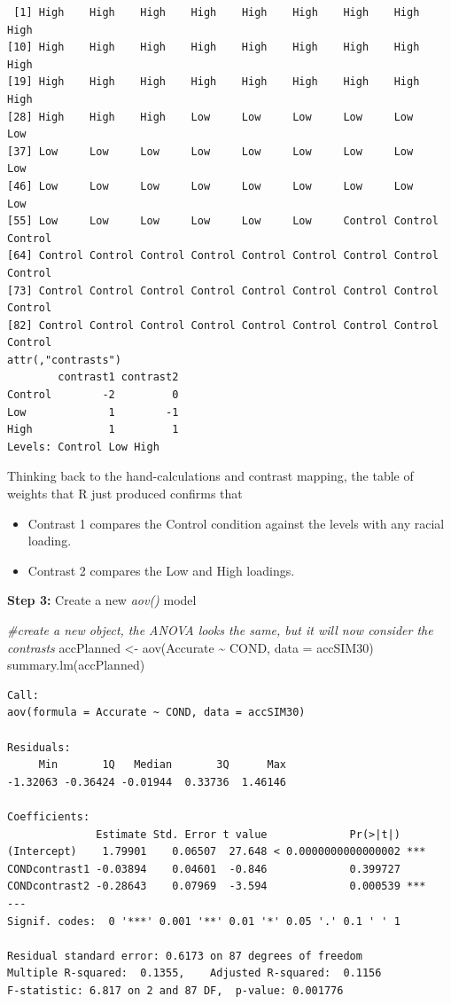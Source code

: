 \documentclass[
  english,
]{book}
\newenvironment{Shaded}{\begin{snugshade}}{\end{snugshade}}
\newcommand{\AttributeTok}[1]{\textcolor[rgb]{0.77,0.63,0.00}{#1}}
\newcommand{\CommentTok}[1]{\textcolor[rgb]{0.56,0.35,0.01}{\textit{#1}}}
\newcommand{\FunctionTok}[1]{\textcolor[rgb]{0.00,0.00,0.00}{#1}}
\newcommand{\NormalTok}[1]{#1}
\newcommand{\OtherTok}[1]{\textcolor[rgb]{0.56,0.35,0.01}{#1}}
\newcommand{\SpecialCharTok}[1]{\textcolor[rgb]{0.00,0.00,0.00}{#1}}
\providecommand{\tightlist}{%
  \setlength{\itemsep}{0pt}\setlength{\parskip}{0pt}}
\begin{document}
\begin{verbatim}
 [1] High    High    High    High    High    High    High    High    High   
[10] High    High    High    High    High    High    High    High    High   
[19] High    High    High    High    High    High    High    High    High   
[28] High    High    High    Low     Low     Low     Low     Low     Low    
[37] Low     Low     Low     Low     Low     Low     Low     Low     Low    
[46] Low     Low     Low     Low     Low     Low     Low     Low     Low    
[55] Low     Low     Low     Low     Low     Low     Control Control Control
[64] Control Control Control Control Control Control Control Control Control
[73] Control Control Control Control Control Control Control Control Control
[82] Control Control Control Control Control Control Control Control Control
attr(,"contrasts")
        contrast1 contrast2
Control        -2         0
Low             1        -1
High            1         1
Levels: Control Low High
\end{verbatim}

Thinking back to the hand-calculations and contrast mapping, the table of weights that R just produced confirms that

\begin{itemize}
\tightlist
\item
  Contrast 1 compares the Control condition against the levels with any racial loading.\\
\item
  Contrast 2 compares the Low and High loadings.
\end{itemize}

\textbf{Step 3:} Create a new \emph{aov()} model

\begin{Shaded}
\begin{Highlighting}[]
\CommentTok{\#create a new object, the ANOVA looks the same, but it will now consider the contrasts}
\NormalTok{accPlanned }\OtherTok{\textless{}{-}} \FunctionTok{aov}\NormalTok{(Accurate }\SpecialCharTok{\textasciitilde{}}\NormalTok{ COND, }\AttributeTok{data =}\NormalTok{ accSIM30)}
\FunctionTok{summary.lm}\NormalTok{(accPlanned)}
\end{Highlighting}
\end{Shaded}

\begin{verbatim}
Call:
aov(formula = Accurate ~ COND, data = accSIM30)

Residuals:
     Min       1Q   Median       3Q      Max 
-1.32063 -0.36424 -0.01944  0.33736  1.46146 

Coefficients:
              Estimate Std. Error t value             Pr(>|t|)    
(Intercept)    1.79901    0.06507  27.648 < 0.0000000000000002 ***
CONDcontrast1 -0.03894    0.04601  -0.846             0.399727    
CONDcontrast2 -0.28643    0.07969  -3.594             0.000539 ***
---
Signif. codes:  0 '***' 0.001 '**' 0.01 '*' 0.05 '.' 0.1 ' ' 1

Residual standard error: 0.6173 on 87 degrees of freedom
Multiple R-squared:  0.1355,    Adjusted R-squared:  0.1156 
F-statistic: 6.817 on 2 and 87 DF,  p-value: 0.001776
\end{verbatim}
\end{document}
